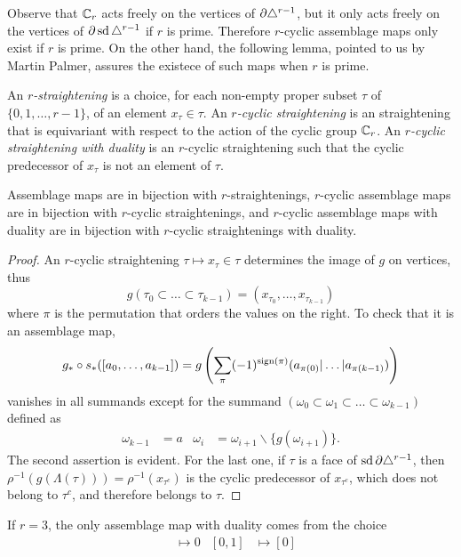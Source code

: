 Observe that $\mathbb{C}_r$ acts freely on the vertices of $\partial \triangle^{r-1}$, but it only acts freely on the vertices of $\partial \operatorname{sd}\triangle^{r-1}$ if $r$ is prime. Therefore $r$-cyclic assemblage maps only exist if $r$ is prime. On the other hand, the following lemma, pointed to us by Martin Palmer, assures the existece of such maps when $r$ is prime.

\begin{definition}
	An \emph{$r$-straightening} is a choice, for each non-empty proper subset $\tau$ of $\{0,1,\dots,r-1\}$, of an element $x_\tau\in \tau$. An \emph{$r$-cyclic straightening} is an straightening that is equivariant with respect to the action of the cyclic group $\mathbb{C}_r$. An \emph{$r$-cyclic straightening with duality} is an $r$-cyclic straightening such that the cyclic predecessor of $x_\tau$ is not an element of $\tau$.
\end{definition}

\begin{lemma}\label{lemma:straightening}
	Assemblage maps are in bijection with $r$-straightenings, $r$-cyclic assemblage maps are in bijection with $r$-cyclic straightenings, and $r$-cyclic assemblage maps with duality are in bijection with $r$-cyclic straightenings with duality.
\end{lemma}

\begin{proof}
	An $r$-cyclic straightening $\tau\mapsto x_{\tau}\in \tau$ determines the image of $g$ on vertices, thus
	\[
	g(\tau_0\subset\dots\subset\tau_{k-1}) = (x_{\tau_0},\dots,x_{\tau_{k-1}})
	\]
	where $\pi$ is the permutation that orders the values on the right. To check that it is an assemblage map,
	\[
	g_*\circ s_*([a_0,\dots,a_{k-1}]) = g\left(\sum_{\pi} (-1)^{\operatorname{sign}(\pi)} (a_{\pi(0)}|\dots|a_{\pi(k-1)})\right)
	\]
	vanishes in all summands except for the summand $(\omega_0 \subset \omega_1 \subset \dots \subset \omega_{k-1})$ defined as
	\begin{align*}
		\omega_{k-1} &= a
		&
		\omega_{i} &= \omega_{i+1}\smallsetminus \{g(\omega_{i+1})\}.
	\end{align*}
	The second assertion is evident. For the last one, if $\tau$ is a face of $\operatorname{sd} \partial \triangle^{r-1}$, then $\rho^{-1}(g(\Lambda(\tau))) = \rho^{-1}(x_{\tau^c})$ is the cyclic predecessor of $x_{\tau^c}$, which does not belong to $\tau^c$, and therefore belongs to $\tau$.
\end{proof}

\begin{example}
	If $r=3$, the only assemblage map with duality comes from the choice
	\begin{align*}
		[0]&\mapsto 0 & [0,1]&\mapsto [0]
	\end{align*}
\end{example}

